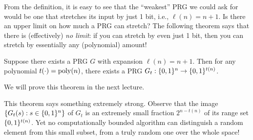\documentclass[11pt]{article}
\begin{document}
From the definition, it is easy to see that the ``weakest'' PRG we
could ask for would be one that stretches its input by just 1 bit,
i.e., $\ell(n) = n+1$.  Is there an upper limit on how much a PRG can
stretch?  The following theorem says that there is (effectively)
\emph{no limit}: if you can stretch by even just 1 bit, then you can
stretch by essentially any (polynomial) amount!

\begin{theorem}
  \label{thm:expansion}
  Suppose there exists a PRG $G$ with expansion $\ell(n)=n+1$.  Then
  for any polynomial $t(\cdot) = \operatorname{poly}(n)$, there exists a PRG $G_t:
  \{0,1\}^n \to \{0,1\}^{t(n)}$.
\end{theorem}

\noindent
We will prove this theorem in the next lecture.

\begin{remark}
  This theorem says something extremely strong.  Observe that the
  image $\{G_{t}(s) : s \in \{0,1\}^{n}\}$ of $G_t$ is an extremely
  small fraction $2^{n-t(n)}$ of its range set $\{0,1\}^{t(n)}$.  Yet no
  computationally bounded algorithm can distinguish a random element
  from this small subset, from a truly random one over the whole
  space!
\end{remark}
\end{document}
